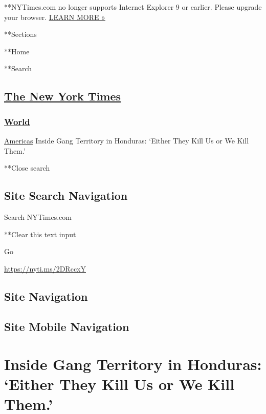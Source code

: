  **NYTimes.com no longer supports Internet Explorer 9 or earlier. Please
upgrade your browser.
\href{http://www.nytimes3xbfgragh.onion/content/help/site/ie9-support.html}{LEARN
MORE »}

**Sections

**Home

**Search

\hypertarget{the-new-york-times}{%
\subsection{\texorpdfstring{\href{http://www.nytimes3xbfgragh.onion/}{The
New York Times}}{The New York Times}}\label{the-new-york-times}}

\hypertarget{-world-}{%
\subsubsection{\texorpdfstring{ \href{/section/world}{World}
}{ World }}\label{-world-}}

 \href{/section/world/americas}{Americas} \textbar{}Inside Gang
Territory in Honduras: `Either They Kill Us or We Kill Them.'

**Close search

\hypertarget{site-search-navigation}{%
\subsection{Site Search Navigation}\label{site-search-navigation}}

Search NYTimes.com

**Clear this text input

Go

\url{https://nyti.ms/2DRccxY}

\hypertarget{site-navigation}{%
\subsection{Site Navigation}\label{site-navigation}}

\hypertarget{site-mobile-navigation}{%
\subsection{Site Mobile Navigation}\label{site-mobile-navigation}}

\hypertarget{inside-gang-territory-in-honduras-either-they-kill-us-or-we-kill-them}{%
\section{Inside Gang Territory in Honduras: `Either They Kill Us or We
Kill
Them.'}\label{inside-gang-territory-in-honduras-either-they-kill-us-or-we-kill-them}}

